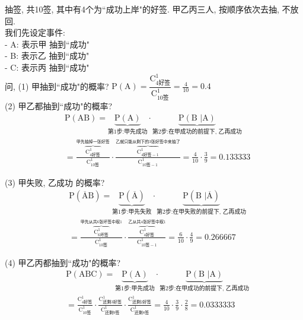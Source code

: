 \documentclass[UTF8]{ctexart}
\begin{document}
\begin{myEnvSample}
	抽签, 共10签, 其中有4个为``成功上岸"的好签. 甲乙丙三人, 按顺序依次去抽, 不放回. \\
	我们先设定事件:  \\
	- A: 表示甲 抽到``成功" \\
	- B: 表示乙 抽到``成功" \\
	- C: 表示丙 抽到``成功" \\
	
	问, (1) 甲抽到``成功"的概率? 
	$
	\text{P}\left( \text{A} \right) =\dfrac{\text{C}_{4\text{好签}}^{1}}{\text{C}_{10\text{签}}^{1}}=\frac{4}{10}=0.4
	$ \\
	
	(2) 甲乙都抽到``成功"的概率?  
\begin{align*}  %
	&\text{P}\left( \text{AB} \right) =\underset{\text{第1步:甲先成功}}{\underbrace{\text{P}\left( \text{A} \right) }}\cdot \underset{\text{第2步:在甲成功的前提下,\ 乙再成功}}{\underbrace{\text{P}\left( \text{B\ |A} \right) }}\\
&=\frac{\overset{\text{甲先抽掉一张好签}}{\overbrace{\text{C}_{4\text{好签}}^{1}}}}{\text{C}_{10\text{签}}^{1}}\cdot \frac{\overset{\text{乙就只能从剩下的3张好签中来抽了}}{\overbrace{\text{C}_{4\text{好签}-1}^{1}}}}{\text{C}_{10\text{签}-1}^{1}}
=\frac{4}{10}\cdot \frac{3}{9}=0.133333
\end{align*}


(3) 甲失败, 乙成功 的概率? 
\begin{align*}  %
	&\text{P}\left( \overline{\text{A}}\text{B} \right) =\underset{\text{第1步:甲先失败}}{\underbrace{\text{P}\left( \overline{\text{A}} \right) }}\cdot \underset{\text{第2步:在甲失败的前提下,\ 乙再成功}}{\underbrace{\text{P}\left( \text{B\ |}\overline{\text{A}} \right) }}\\
&=\frac{\overset{\text{甲先从共6张坏签中取}1}{\overbrace{\text{C}_{6\text{坏签}}^{1}}}}{\text{C}_{10\text{签}}^{1}}\cdot \frac{\overset{\text{乙从共4张好签中取}1}{\overbrace{\text{C}_{4\text{好签}}^{1}}}}{\text{C}_{10\text{签}-1}^{1}}
=\frac{6}{10}\cdot \frac{4}{9}=0.266667
\end{align*}



(4) 甲乙丙都抽到``成功"的概率? 
\begin{align*}  %
	&\text{P}\left( \text{ABC} \right) =\underset{\text{第1步:甲先成功}}{\underbrace{\text{P}\left( \text{A} \right) }}\cdot \underset{\text{第2步:在甲成功的前提下,\ 乙再成功}}{\underbrace{\text{P}\left( \text{B\ |A} \right) }}\\
&=\frac{\text{C}_{4\text{好签}}^{1}}{\text{C}_{10\text{签}}^{1}}\cdot \frac{\text{C}_{\text{还剩3好签}}^{1}}{\text{C}_{\text{还剩9签}}^{1}}\cdot \frac{\text{C}_{\text{还剩2好签}}^{1}}{\text{C}_{\text{还剩8签}}^{1}}=\frac{4}{10}\cdot \frac{3}{9}\cdot \frac{2}{8}=0.0333333
\end{align*}
\end{myEnvSample}
\end{document}
